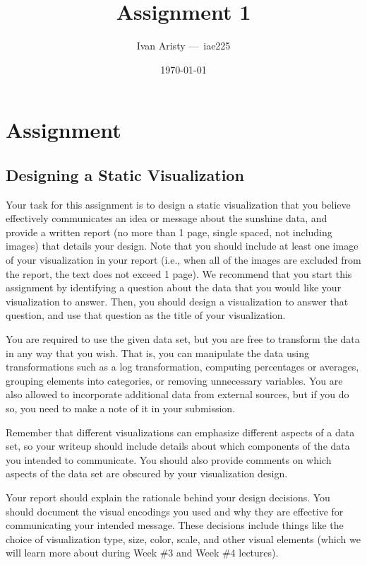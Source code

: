 \documentclass{article}
\title{Assignment 1}
\author{Ivan Aristy — iae225}
\date{\today}
\begin{document}
\maketitle

\section{Assignment }
\subsection{Designing a Static Visualization}

Your task for this assignment is to design a static visualization that you believe effectively communicates an idea or message about the sunshine data, and provide a written report (no more than 1 page, single spaced, not including images) that details your design. Note that you should include at least one image of your visualization in your report (i.e., when all of the images are excluded from the report, the text does not exceed 1 page). We recommend that you start this assignment by identifying a question about the data that you would like your visualization to answer. Then, you should design a visualization to answer that question, and use that question as the title of your visualization.

You are required to use the given data set, but you are free to transform the data in any way that you wish. That is, you can manipulate the data using transformations such as a log transformation, computing percentages or averages, grouping elements into categories, or removing unnecessary variables. You are also allowed to incorporate additional data from external sources, but if you do so, you need to make a note of it in your submission.

Remember that different visualizations can emphasize different aspects of a data set, so your writeup should include details about which components of the data you intended to communicate. You should also provide comments on which aspects of the data set are obscured by your visualization design.

Your report should explain the rationale behind your design decisions. You should document the visual encodings you used and why they are effective for communicating your intended message. These decisions include things like the choice of visualization type, size, color, scale, and other visual elements (which we will learn more about during Week \#3 and Week \#4 lectures).
\end{document}
